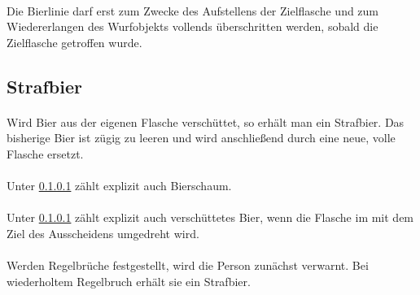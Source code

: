\paragraph{}
Die Bierlinie darf erst zum Zwecke des Aufstellens der Zielflasche und zum Wiedererlangen des Wurfobjekts vollends überschritten werden, sobald die Zielflasche getroffen wurde.

\subsection{Strafbier}
\paragraph{} \label{Flunkyball:Strafbier:Allg}
Wird Bier aus der eigenen Flasche verschüttet, so erhält man ein Strafbier.
Das bisherige Bier ist zügig zu leeren und wird anschließend durch eine neue, volle Flasche ersetzt.

\paragraph{}
Unter \ref{Flunkyball:Strafbier:Allg} zählt explizit auch Bierschaum.

\paragraph{}
Unter \ref{Flunkyball:Strafbier:Allg} zählt explizit auch verschüttetes Bier, wenn die Flasche im mit dem Ziel des Ausscheidens umgedreht wird.

\paragraph{}
Werden Regelbrüche festgestellt, wird die Person zunächst verwarnt.
Bei wiederholtem Regelbruch erhält sie ein Strafbier.
